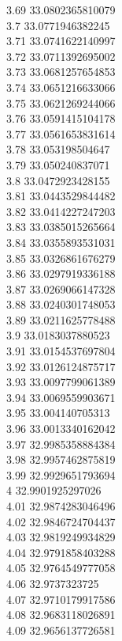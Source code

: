 {3.69	33.0802365810079\\
3.7	33.0771946382245\\
3.71	33.0741622140997\\
3.72	33.0711392695002\\
3.73	33.0681257654853\\
3.74	33.0651216633066\\
3.75	33.0621269244066\\
3.76	33.0591415104178\\
3.77	33.0561653831614\\
3.78	33.053198504647\\
3.79	33.050240837071\\
3.8	33.0472923428155\\
3.81	33.0443529844482\\
3.82	33.0414227247203\\
3.83	33.0385015265664\\
3.84	33.0355893531031\\
3.85	33.0326861676279\\
3.86	33.0297919336188\\
3.87	33.0269066147328\\
3.88	33.0240301748053\\
3.89	33.0211625778488\\
3.9	33.0183037880523\\
3.91	33.0154537697804\\
3.92	33.0126124875717\\
3.93	33.0097799061389\\
3.94	33.0069559903671\\
3.95	33.004140705313\\
3.96	33.0013340162042\\
3.97	32.9985358884384\\
3.98	32.9957462875819\\
3.99	32.9929651793694\\
4	32.9901925297026\\
4.01	32.9874283046496\\
4.02	32.9846724704437\\
4.03	32.9819249934829\\
4.04	32.9791858403288\\
4.05	32.9764549777058\\
4.06	32.9737323725\\
4.07	32.9710179917586\\
4.08	32.9683118026891\\
4.09	32.9656137726581\\
}
